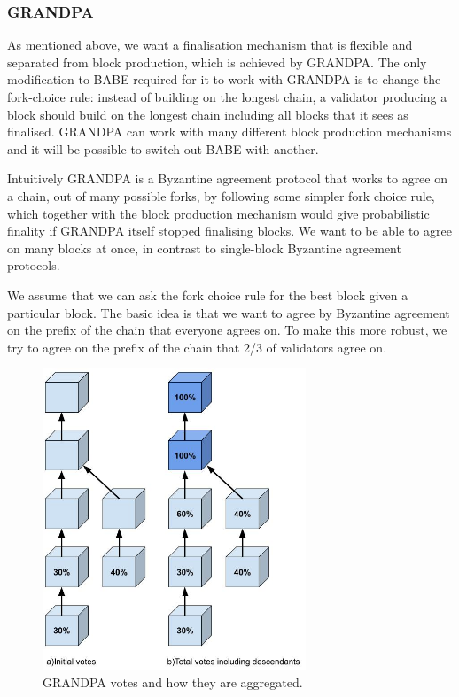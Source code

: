\subsubsection{GRANDPA} \label{sec:grandpa}


As mentioned above, we want a finalisation mechanism that is flexible and separated from block production, which is achieved by GRANDPA. The only modification to BABE required for it to work with GRANDPA is to change the fork-choice rule: instead of building on the longest chain, a validator producing a block should build on the longest chain including all blocks that it sees as finalised. GRANDPA can work with many different block production mechanisms and it will be possible to switch out BABE with another.

Intuitively GRANDPA is a Byzantine agreement protocol that works to agree on a chain, out of many possible forks, by following some simpler fork choice rule, which together with the block production mechanism would give probabilistic finality if GRANDPA itself stopped finalising blocks. We want to be able to agree on many blocks at once, in contrast to single-block Byzantine agreement protocols.

We assume that we can ask the fork choice rule for the best block given a particular block. The basic idea is that we want to agree by Byzantine agreement on the prefix of the chain that everyone agrees on. To make this more robust, we try to agree on the prefix of the chain that 2/3 of validators agree on.

\begin{figure}[h!]
  \centering
  \includegraphics[width=0.7\textwidth]{images/Grandpa.jpg}
  \caption{GRANDPA votes and how they are aggregated.}
    \label{fig:grandpa}
\end{figure}

